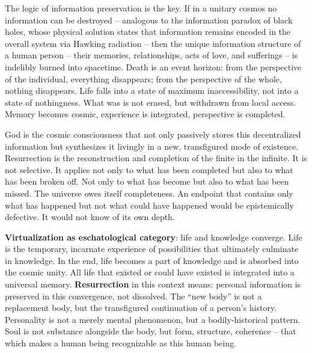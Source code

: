 \documentclass[
  english,
]{article}
\begin{document}
The logic of information preservation is the key. If in a unitary cosmos
no information can be destroyed -- analogous to the information paradox
of black holes, whose physical solution states that information remains
encoded in the overall system via Hawking radiation -- then the unique
information structure of a human person -- their memories,
relationships, acts of love, and sufferings -- is indelibly burned into
spacetime. Death is an event horizon: from the perspective of the
individual, everything disappears; from the perspective of the whole,
nothing disappears. Life falls into a state of maximum inaccessibility,
not into a state of nothingness. What was is not erased, but withdrawn
from local access. Memory becomes cosmic, experience is integrated,
perspective is completed.

God is the cosmic consciousness that not only passively stores this
decentralized information but synthesizes it livingly in a new,
transfigured mode of existence. Resurrection is the reconstruction and
completion of the finite in the infinite. It is not selective. It
applies not only to what has been completed but also to what has been
broken off. Not only to what has become but also to what has been
missed. The universe owes itself completeness. An endpoint that contains
only what has happened but not what could have happened would be
epistemically defective. It would not know of its own depth.

\textbf{Virtualization as eschatological category}: life and knowledge
converge. Life is the temporary, incarnate experience of possibilities
that ultimately culminate in knowledge. In the end, life becomes a part
of knowledge and is absorbed into the cosmic unity. All life that
existed or could have existed is integrated into a universal memory.
\textbf{Resurrection} in this context means: personal information is
preserved in this convergence, not dissolved. The ``new body'' is not a
replacement body, but the transfigured continuation of a person's
history. Personality is not a merely mental phenomenon, but a
bodily-historical pattern. Soul is not substance alongside the body, but
form, structure, coherence -- that which makes a human being
recognizable as this human being.
\end{document}
